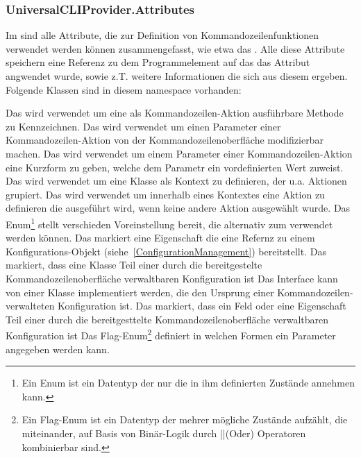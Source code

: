 \subsubsection{UniversalCLIProvider.Attributes}
Im  sind alle Attribute, die zur Definition von Kommandozeilenfunktionen verwendet werden können zusammengefasst, wie etwa das .
Alle diese Attribute speichern eine Referenz zu dem Programmelement auf das das Attribut angwendet wurde, sowie z.T. weitere Informationen die sich aus diesem ergeben.
Folgende Klassen sind in diesem namespace vorhanden:
\begin{outline}
 \1 Das  wird verwendet um eine als Kommandozeilen-Aktion ausführbare Methode zu Kennzeichnen.
 \1 Das  wird verwendet um einen Parameter einer Kommandozeilen-Aktion von der Kommandozeilenoberfläche modifizierbar machen.
 \1 Das  wird verwendet um einem Parameter einer Kommandozeilen-Aktion eine Kurzform zu geben, welche dem Parametr ein vordefinierten Wert zuweist.
 \1 Das  wird verwendet um eine Klasse als Kontext zu definieren, der u.a. Aktionen grupiert.
 \1 Das  wird verwendet um innerhalb eines Kontextes eine Aktion zu definieren die ausgeführt wird, wenn keine andere Aktion ausgewählt wurde.
 \1 Das Enum\footnote{Ein Enum ist ein Datentyp der nur die in ihm definierten Zustände annehmen kann.} 
 stellt verschieden Voreinstellung bereit, die alternativ zum  verwendet werden können.
 \1 Das  markiert eine Eigenschaft die eine Refernz zu einem Konfigurations-Objekt (siehe~\ref{ConfigurationManagement}) bereitstellt.
 \1 Das  markiert, dass eine Klasse Teil einer durch die bereitgestelte Kommandozeilenoberfläche verwaltbaren Konfiguration ist
 \1 Das Interface  kann von einer Klasse implementiert werden, die den Ursprung einer Kommandozeilen-verwalteten Konfiguration ist.
 \1 Das markiert, dass ein Feld oder eine Eigenschaft Teil einer durch die bereitgesttelte Kommandozeilenoberfläche verwaltbaren Konfiguration ist
 \1 Das Flag-Enum\footnote{Ein Flag-Enum ist ein Datentyp der mehrer mögliche Zustände aufzählt, die miteinander, auf Basis von Binär-Logik durch ||(Oder) Operatoren kombinierbar sind.}
  definiert in welchen Formen ein Parameter angegeben werden kann.
\end{outline}
